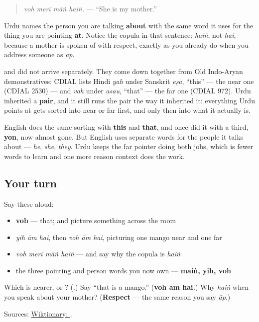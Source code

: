\begin{quote}
\emph{voh merī māṅ haiṅ.} — \textquotedblleft{}She is my mother.\textquotedblright{}
\end{quote}

Urdu names the person you are talking \textbf{about} with the same word it uses for the thing you are pointing \textbf{at}. Notice the copula in that sentence: \emph{haiṅ}, not \emph{hai}, because a mother is spoken of with respect, exactly as you already do when you address someone as \emph{āp}.

\begin{cousinweb}
\textbf{} and \textbf{} did not arrive separately. They come down together from Old Indo-Aryan demonstratives: CDIAL lists Hindi \emph{yah} under Sanskrit \emph{eṣa}, \textquotedblleft{}this\textquotedblright{} — the near one (CDIAL 2530) — and \emph{vah} under \emph{asau}, \textquotedblleft{}that\textquotedblright{} — the far one (CDIAL 972). Urdu inherited a \textbf{pair}, and it still runs the pair the way it inherited it: everything Urdu points at gets sorted into near or far first, and only then into what it actually is.

English does the same sorting with \textbf{this} and \textbf{that}, and once did it with a third, \textbf{yon}, now almost gone. But English uses separate words for the people it talks about — \emph{he}, \emph{she}, \emph{they}. Urdu keeps the far pointer doing both jobs, which is fewer words to learn and one more reason context does the work.
\end{cousinweb}

\subsection*{Your turn}
Say these aloud:

\begin{itemize}
\raggedright
  \item \textbf{voh} — that; and picture something across the room
  \item \emph{yih ām hai}, then \emph{voh ām hai}, picturing one mango near and one far
  \item \emph{voh merī māṅ haiṅ} — and say why the copula is \emph{haiṅ}
  \item the three pointing and person words you now own — \textbf{maiṅ, yih, voh}
\end{itemize}

\begin{tcolorbox}[breakable,colback=teal!4,colframe=teal!35!black,title={Before you move on}]
Which is nearer, \textbf{} or \textbf{}? (\textbf{}.) Say \textquotedblleft{}that is a mango.\textquotedblright{} (\textbf{voh ām hai.}) Why \emph{haiṅ} when you speak about your mother? (\textbf{Respect} — the same reason you say \emph{āp}.)

Sources: \href{https://en.wiktionary.org/wiki/\%D9\%88\%DB\%81}{Wiktionary: }.
\end{tcolorbox}
